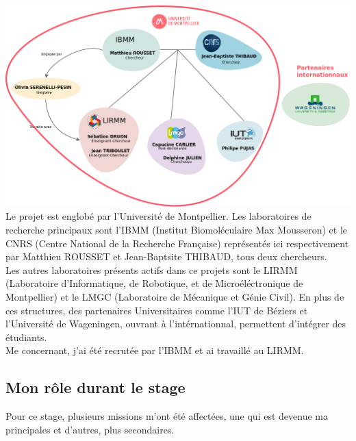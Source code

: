 \documentclass[11pt,french,a4paper]{report}
\begin{document}
\includegraphics[scale=0.3]{../images/dia/organiramme_equipe_projet.png} \\

Le projet est englobé par l'Université de Montpellier. Les laboratoires de recherche principaux sont l'IBMM (Institut Biomoléculaire Max Mousseron) 
et le CNRS (Centre National de la Recherche Française) représentés ici respectivement par Matthieu ROUSSET et Jean-Baptsite THIBAUD, tous deux chercheurs. \\
Les autres laboratoires présents actifs dans ce projets sont le LIRMM (Laboratoire d'Informatique, de Robotique, et de Microéléctronique de Montpellier) 
et le LMGC (Laboratoire de Mécanique et Génie Civil). En plus de ces structures, des partenaires Universitaires comme l'IUT de Béziers et  
l'Université de Wageningen, ouvrant à l'intérnationnal, permettent d'intégrer des étudiants. \\
Me concernant, j'ai été recrutée par l'IBMM et ai travaillé au LIRMM.

\subsection{Mon rôle durant le stage}
Pour ce stage, plusieurs missions m'ont été affectées, une qui est devenue ma principales et d'autres, plus secondaires.\\
\end{document}
